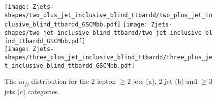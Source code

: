 \begin{figure}[!htb]
  \centering
  \texttt{[image: Zjets-shapes/two\_plus\_jet\_inclusive\_blind\_ttbardd/two\_plus\_jet\_inclusive\_blind\_ttbardd\_GSCMbb.pdf]}
  \texttt{[image: Zjets-shapes/two\_jet\_inclusive\_blind\_ttbardd/two\_jet\_inclusive\_blind\_ttbardd\_GSCMbb.pdf]} \\
  \texttt{[image: Zjets-shapes/three\_plus\_jet\_inclusive\_blind\_ttbardd/three\_plus\_jet\_inclusive\_blind\_ttbardd\_GSCMbb.pdf]}
  \caption{The $m_{jj}$ distribution for the 2 lepton $\geq 2$ jets (a), 2-jet
    (b) and $\ge 3$ jets (c) categories.}
  \label{fig:zjets-mbb-shapes}
\end{figure}